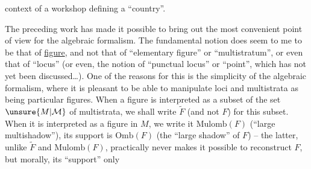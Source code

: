 context of a workshop defining a ``country''.

The preceding work has made it possible to bring out the most convenient point of view for the algebraic formalism. The fundamental notion does seem to me to be that of \uline{figure}, and not that of ``elementary figure'' or ``multistratum'', or even that of ``locus'' (or even, the notion of ``punctual locus'' or ``point'', which has not yet been discussed\ldots). One of the reasons for this is the simplicity of the algebraic formalism,
%
 where it is pleasant to be able to manipulate loci and multistrata as being particular figures. When a figure  is interpreted  as a subset of the set $\unsure{M|\mathcal M}$  of multistrata, we shall write $\widetilde F$ (and not $F$) for this subset. When it is interpreted as a  figure in $M$, we write it $\mathrm{Mulomb}(F)$ (``large multishadow''), its support is $\mathrm{Omb}(F)$ (the ``large shadow'' of $F$) -- the latter, unlike $\widetilde F$ and $\mathrm{Mulomb}(F)$, practically never makes it possible to reconstruct $F$,  but morally, its ``support'' only
